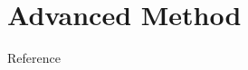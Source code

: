 \documentclass[mathserif, xcolor=table]{beamer}
\begin{document}
\section{Advanced Method}

%

\begin{frame}[allowframebreaks]{Reference}
	
	
\end{frame}
\end{document}
